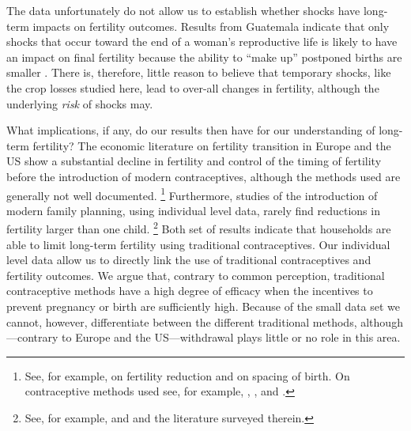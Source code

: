 \documentclass[letterpaper,12pt]{article}
\begin{document}
The data unfortunately do not allow us to establish whether shocks
have long-term impacts on fertility outcomes.
Results from Guatemala indicate that only shocks that occur 
toward the end of a woman's reproductive life is likely to have an 
impact on final fertility because the ability to ``make up'' 
postponed births are smaller \citep{Portner2014}.
There is, therefore, little reason to believe that temporary shocks,
like the crop losses studied here, lead to over-all changes in fertility,
although the underlying \emph{risk} of shocks may. 


What implications, if any, do our results then have for our understanding 
of long-term fertility?
The economic literature on fertility transition in Europe and the US 
show a substantial decline in fertility and control of the timing of 
fertility before the introduction of modern contraceptives, although 
the methods used are generally not well documented.%
\footnote{
See, for example, \citet{Guinnane2011} on fertility reduction and 
\citet{Cinnirella2017} on spacing of birth.
On contraceptive methods used see, for example, \citet{Michael1976},
\citet{David1986}, and \citet{Santow1995}.
}
Furthermore, studies of the introduction of modern family planning, 
using individual level data, rarely find reductions in fertility larger 
than one child.%
\footnote{
See, for example, \citet{Portner2014a} 
and \citet{Portner2018} and the literature surveyed therein.
}
Both set of results indicate that households are able to 
limit long-term fertility using traditional contraceptives.
Our individual level data allow us to directly link the use of
traditional contraceptives and fertility outcomes.
We argue that, contrary to common perception, traditional
contraceptive methods have a high degree of efficacy when the
incentives to prevent pregnancy or birth are sufficiently high.
Because of the small data set we cannot, however, differentiate between
the different traditional methods, although---contrary to Europe 
and the US---withdrawal plays little or no role in this area.
\end{document}
